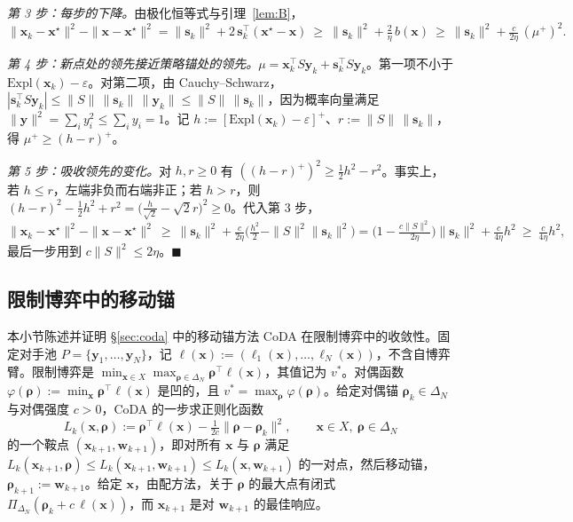 \documentclass{article}
\theoremstyle{plain}
\theoremstyle{remark}
\newcommand{\Expl}{\mathrm{Expl}}
\newcommand{\Proj}{\Pi}
\newcommand{\simplex}{\Delta}
\newcommand{\bx}{{\bm{x}}}
\newcommand{\by}{{\bm{y}}}
\newcommand{\bw}{{\bm{w}}}
\newcommand{\brho}{{\bm{\rho}}}
\newcommand{\bell}{{\bm{\ell}}}
\newcommand{\xs}{\bx^{\star}}
\newcommand{\dx}{{\bm{s}}}
\newcommand{\coda}{CoDA}
\begin{document}
\textit{第 3 步：每步的下降。}由极化恒等式与引理~\ref{lem:B}，
\[
\|\bx_k-\xs\|^2-\|\bx-\xs\|^2=\|\dx_k\|^2+2\,\dx_k^\top(\xs-\bx)\ \ge\ \|\dx_k\|^2+\tfrac2\eta\,b(\bx)\ \ge\ \|\dx_k\|^2+\tfrac{c}{2\eta}\,(\mu^+)^2 .
\]

\textit{第 4 步：新点处的领先接近策略锚处的领先。}$\mu=\bx_k^\top S\by_k+\dx_k^\top S\by_k$。第一项不小于 $\Expl(\bx_k)-\varepsilon$。对第二项，由 Cauchy--Schwarz，$|\dx_k^\top S\by_k|\le\|S\|\,\|\dx_k\|\,\|\by_k\|\le\|S\|\,\|\dx_k\|$，因为概率向量满足 $\|\by\|^2=\sum_iy_i^2\le\sum_iy_i=1$。记 $h:=[\Expl(\bx_k)-\varepsilon]^+$、$r:=\|S\|\,\|\dx_k\|$，得 $\mu^+\ge(h-r)^+$。

\textit{第 5 步：吸收领先的变化。}对 $h,r\ge0$ 有 $((h-r)^+)^2\ge\tfrac12h^2-r^2$。事实上，若 $h\le r$，左端非负而右端非正；若 $h>r$，则 $(h-r)^2-\tfrac12h^2+r^2=\big(\tfrac{h}{\sqrt2}-\sqrt2r\big)^2\ge0$。代入第 3 步，
\[
\|\bx_k-\xs\|^2-\|\bx-\xs\|^2\ \ge\ \|\dx_k\|^2+\tfrac{c}{2\eta}\Big(\tfrac{h^2}2-\|S\|^2\|\dx_k\|^2\Big)=\Big(1-\tfrac{c\|S\|^2}{2\eta}\Big)\|\dx_k\|^2+\tfrac{c}{4\eta}h^2\ \ge\ \tfrac{c}{4\eta}h^2 ,
\]
最后一步用到 $c\|S\|^2\le2\eta$。\hfill$\blacksquare$

\subsection{限制博弈中的移动锚}
\label{app:coda}

本小节陈述并证明 \S\ref{sec:coda} 中的移动锚方法 \coda{} 在限制博弈中的收敛性。固定对手池 $P=\{\by_1,\dots,\by_N\}$，记 $\bell(\bx):=(\ell_1(\bx),\dots,\ell_N(\bx))$，不含自博弈臂。限制博弈是 $\min_{\bx\in X}\max_{\brho\in\simplex_N}\brho^\top\bell(\bx)$，其值记为 $v^*$。对偶函数 $\varphi(\brho):=\min_\bx\brho^\top\bell(\bx)$ 是凹的，且 $v^*=\max_\brho\varphi(\brho)$。给定对偶锚 $\brho_k\in\simplex_N$ 与对偶强度 $c>0$，\coda{} 的一步求正则化函数
\begin{equation}
L_k(\bx,\brho):=\brho^\top\bell(\bx)-\tfrac1{2c}\|\brho-\brho_k\|^2 ,\qquad \bx\in X,\ \brho\in\simplex_N
\label{eq:coda}
\end{equation}
的一个鞍点 $(\bx_{k+1},\bw_{k+1})$，即对所有 $\bx$ 与 $\brho$ 满足 $L_k(\bx_{k+1},\brho)\le L_k(\bx_{k+1},\bw_{k+1})\le L_k(\bx,\bw_{k+1})$ 的一对点，然后移动锚，$\brho_{k+1}:=\bw_{k+1}$。给定 $\bx$，由配方法，关于 $\brho$ 的最大点有闭式 $\Proj_{\simplex_N}(\brho_k+c\,\bell(\bx))$，而 $\bx_{k+1}$ 是对 $\bw_{k+1}$ 的最佳响应。
\end{document}
